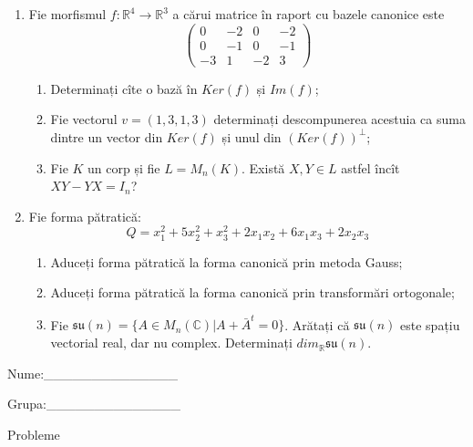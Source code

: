 \documentclass{article}
\begin{document}
\begin{enumerate}
 \item Fie morfismul $f:\mathbb{R}^4 \to \mathbb{R}^3$ a cărui matrice în raport cu bazele canonice este
$$\begin{pmatrix}
0&-2&0&-2\\
0&-1&0&-1\\
-3&1&-2&3
\end{pmatrix}$$

\begin{enumerate}
\item Determinați cîte o bază în $Ker(f)$ și $Im(f)$;
\item Fie vectorul $v=(1,3,1,3)$ determinați descompunerea acestuia ca suma dintre un vector din $Ker(f)$ și unul din $(Ker(f))^\perp$;
\item Fie $K$ un corp și fie $L=M_n(K)$. Există $X,Y \in L$ astfel încît $XY-YX=I_n$?  
\end{enumerate}
\item Fie forma pătratică:
$$Q= x_1^2+5x_2^2+x_3^2+2x_1x_2+6x_1x_3+2x_2x_3$$

\begin{enumerate}
\item Aduceți forma pătratică la forma canonică prin metoda Gauss;
\item Aduceți forma pătratică la forma canonică prin transformări ortogonale;
\item Fie $\mathfrak{su}(n)=\{ A \in M_n(\mathbb{C}) | A+\bar{A}^t=0\}$. Arătați că $\mathfrak{su}(n)$ este spațiu vectorial real, dar nu complex.
Determinați $dim_{\mathbb{R}}\mathfrak{su}(n)$.
\end{enumerate}
\end{enumerate}
\newpage
\begin{flushright}
Nume:\_\_\_\_\_\_\_\_\_\_\_\_\_\_
 
 
Grupa:\_\_\_\_\_\_\_\_\_\_\_\_\_\_
\end{flushright}
\begin{center}
\vspace{2cm}
{\Large Probleme}
\vspace{2cm}
\end{center}
\end{document}
